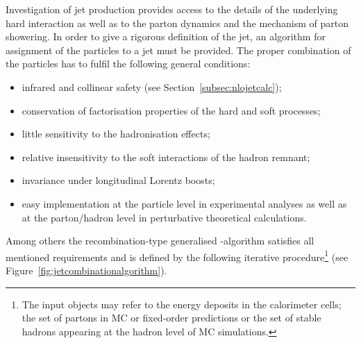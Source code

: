 Investigation of jet production provides access to the details of the underlying hard interaction as well as to the parton dynamics and the mechanism of parton showering. In order to give a rigorous definition of the jet, an algorithm for assignment of the particles to a jet must be provided. The proper combination of the particles has to fulfil the following general conditions:
\begin{itemize}
	\item infrared and collinear safety (see Section~\ref{subsec:nlojetcalc});
	\item conservation of factorisation properties of the hard and soft processes;
	\item little sensitivity to the hadronisation effects;
	\item relative insensitivity to the soft interactions of the hadron remnant;
	\item invariance under longitudinal Lorentz boosts;
	\item easy implementation at the particle level in experimental analyses as well as at the parton/hadron level in perturbative theoretical calculations.
\end{itemize}
Among others the recombination-type generalised \kt-algorithm satisfies all mentioned requirements and is defined by the following iterative procedure\footnote{The input objects may refer to the energy deposits in the calorimeter cells; the set of partons in MC or fixed-order predictions or the set of stable hadrons appearing at the hadron level of MC simulations.} (see Figure~\ref{fig:jetcombinationalgorithm}).
